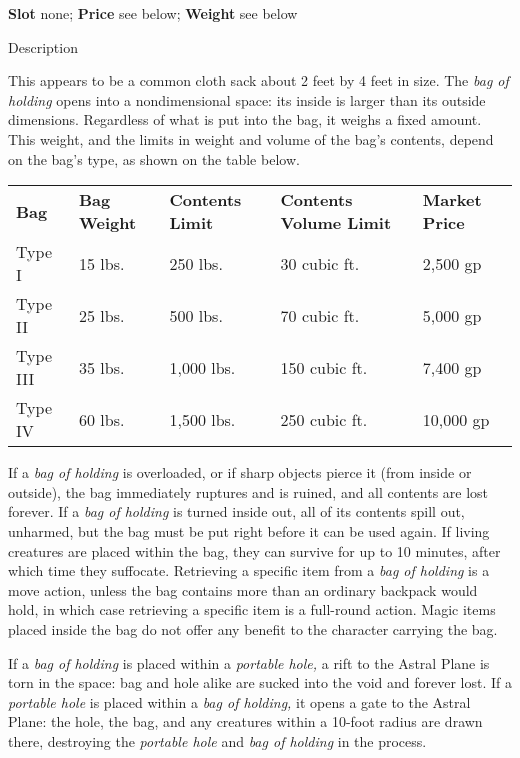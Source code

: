 \textbf{Slot} none; \textbf{Price} see below; \textbf{Weight }see below
				
Description
				
This appears to be a common cloth sack about 2 feet by 4 feet in size. The \textit{bag of holding }opens into a nondimensional space: its inside is larger than its outside dimensions. Regardless of what is put into the bag, it weighs a fixed amount. This weight, and the limits in weight and volume of the bag's contents, depend on the bag's type, as shown on the table below.
				

\begin{tabular}{lllll}
\textbf{Bag} & \textbf{Bag Weight} & \textbf{Contents Limit} & \textbf{Contents Volume Limit} & \textbf{Market Price}\\
Type I & 15 lbs. & 250 lbs. & 30 cubic ft. & 2,500 gp\\
Type II & 25 lbs. & 500 lbs. & 70 cubic ft. & 5,000 gp\\
Type III & 35 lbs. & 1,000 lbs. & 150 cubic ft. & 7,400 gp\\
Type IV & 60 lbs. & 1,500 lbs. & 250 cubic ft. & 10,000 gp\\
\end{tabular}
				
If a \textit{bag of holding} is overloaded, or if sharp objects pierce it (from inside or outside), the bag immediately ruptures and is ruined, and all contents are lost forever. If a \textit{bag of holding }is turned inside out, all of its contents spill out, unharmed, but the bag must be put right before it can be used again. If living creatures are placed within the bag, they can survive for up to 10 minutes, after which time they suffocate. Retrieving a specific item from a \textit{bag of holding }is a move action, unless the bag contains more than an ordinary backpack would hold, in which case retrieving a specific item is a full-round action. Magic items placed inside the bag do not offer any benefit to the character carrying the bag.
				
If a \textit{bag of holding }is placed within a \textit{portable hole,} a rift to the Astral Plane is torn in the space: bag and hole alike are sucked into the void and forever lost. If a \textit{portable hole }is placed within a \textit{bag of holding, }it opens a gate to the Astral Plane: the hole, the bag, and any creatures within a 10-foot radius are drawn there, destroying the \textit{portable hole }and \textit{bag of holding }in the process. 
				
